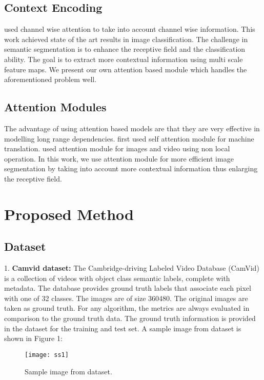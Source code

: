 \documentclass{article}
\begin{document}
\subsection{Context Encoding}

\citep{hu2018squeeze} used channel wise attention to take into account channel wise information. This work achieved state of the art results in image classification. The challenge in semantic segmentation is to enhance the receptive field and the classification ability. The goal is to extract more contextual information using multi scale feature maps. We present our own attention based module which handles the aforementioned problem well.

\subsection{Attention Modules}

The advantage of using attention based models are that they are very effective in modelling long range dependencies. \citep{vaswani2017attention} first used self attention module for machine translation. \citep{wang2018non} used attention module for images and video using non local operation. In this work, we use attention module for more efficient image segmentation by taking into account more contextual information thus enlarging the receptive field.

\section{Proposed Method}

\subsection{Dataset}

1. \textbf{Camvid dataset:} The Cambridge-driving Labeled Video Database (CamVid) is a collection of videos with object class semantic labels, complete with metadata. The database provides ground truth labels that associate each pixel with one of 32 classes. The images are of size 360480. The original images are taken as ground truth. For any algorithm, the metrics are always evaluated in comparison to the ground truth data. The ground truth information is provided in the dataset for the training and test set. A sample image from dataset is shown in Figure 1:

\begin{figure}[htp]
    \centering
    \texttt{[image: ss1]}
    \caption{Sample image from dataset.}
    \label{fig3}
\end{figure}
\end{document}
